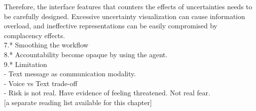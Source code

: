 Therefore, the interface features that counters the effects of uncertainties needs to be carefully designed. Excessive uncertainty visualization can cause information overload, and ineffective representations can be easily compromised by complacency effects. \\


7.*  Smoothing the workflow\\

8.* Accountability become opaque by using the agent. \\

9.* Limitation\\
- Text message as communication modality.  \\
- Voice vs Text trade-off\\
- Risk is not real. Have evidence of feeling threatened. Not real fear. \\


[a separate reading list available for this chapter]\\







